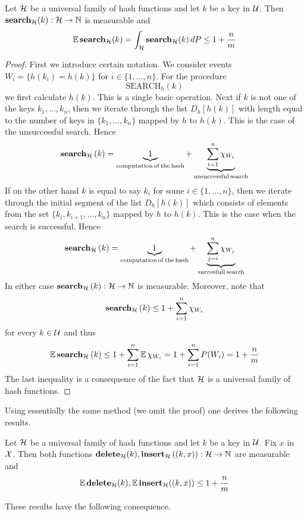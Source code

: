 \begin{theorem}\label{theorem:universal_family_of_hash_functions_expected_cost_for_search}
Let ${\mathcal H}$ be a universal family of hash functions and let $k$ be a key in ${\mathcal U}$. Then $\mathbf{search}_{\mathcal H}(k):{\mathcal H}\rightarrow {\mathbb N}$ is measurable and
$$\mathbb{E}\,\mathbf{search}_{\mathcal H}(k) = \int_{{\mathcal H}}\mathbf{search}_{\mathcal H}(k)\,dP \leq 1 + \frac{n}{m}$$
\end{theorem}
\begin{proof}
First we introduce certain notation. We consider events $W_{i} = \big\{h(k_i) = h(k)\big\}$ for $i\in \{1,...,n\}$. For the procedure
$$\mathrm{SEARCH}_h(k)$$
we first calculate $h(k)$. This is a single basic operation. Next if $k$ is not one of the keys $k_1,...,k_n$, then we iterate through the list $D_h[h(k)]$ with length equal to the number of keys in $\big\{k_1,...,k_n\big\}$ mapped by $h$ to $h(k)$. This is the case of the unsuccessful search. Hence
$$\mathbf{search}_{\mathcal H}\left(k\right) = \underbrace{1}_{\mathrm{computation\,of\,the\,hash}} + \underbrace{\sum_{i=1}^n \chi_{W_{i}}}_{\mathrm{unsuccessful\,search}}$$
If on the other hand $k$ is equal to say $k_i$ for some $i\in \{1,...,n\}$, then we iterate through the initial segment of the list $D_h[h(k)]$ which consists of elements from the set $\big\{k_i,k_{i+1},...,k_n\big\}$ mapped by $h$ to $h(k)$. This is the case when the search is successful. Hence
$$\mathbf{search}_{\mathcal H}\left(k\right) = \underbrace{1}_{\mathrm{computation\,of\,the\,hash}} + \underbrace{\sum_{j = i}^n \chi_{W_{j}}}_{\mathrm{succesfull\,search}}$$
In either case $\mathbf{search}_{\mathcal H}\left(k\right):{\mathcal H}\rightarrow {\mathbb N}$ is measurable. Moreover, note that
$$\mathbf{search}_{{\mathcal H}}\left(k\right) \leq 1 + \sum_{i=1}^n \chi_{W_{i}}$$
for every $k\in {\mathcal U}$ and thus
$$\mathbb{E}\,\mathbf{search}_{\mathcal H}\left(k\right) \leq 1 +  \sum_{i=1}^n \mathbb{E}\,\chi_{W_{i}} = 1 + \sum_{i=1}^nP(W_i) =  1 + \frac{n}{m}$$
The last inequality is a consequence of the fact that ${\mathcal H}$ is a universal family of hash functions.
\end{proof}
\noindent
Using essentially the same method (we omit the proof) one derives the following results.

\begin{theorem}\label{theorem:universal_family_of_hash_functions_expected_costs_of_delete_and_insert}
Let ${\mathcal H}$ be a universal family of hash functions and let $k$ be a key in ${\mathcal U}$. Fix $x$ in ${\mathcal X}$. Then both functions $\mathbf{delete}_{\mathcal H}(k),\mathbf{insert}_{\mathcal H}\left((k,x)\right):{\mathcal H}\rightarrow {\mathbb N}$ are measurable and
$$\mathbb{E}\,\mathbf{delete}_{\mathcal H}(k), \mathbb{E}\,\mathbf{insert}_{\mathcal H}((k,x))  \leq 1 + \frac{n}{m}$$
\end{theorem}
\noindent
These results have the following consequence.

